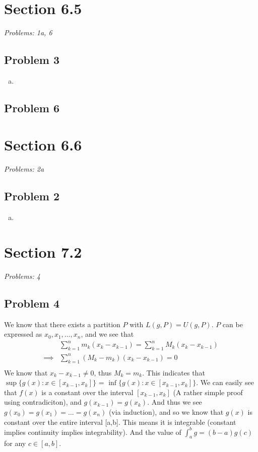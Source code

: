 \documentclass[12pt]{article}
\begin{document}

\section*{Section 6.5}
\textit{Problems: 1a, 6}

\subsection*{Problem 3}
\begin{enumerate}[a).]
    \item {
    }
\end{enumerate}

\subsection*{Problem 6}


\vspace*{1cm}


\section*{Section 6.6}
\textit{Problems: 2a}

\subsection*{Problem 2}
\begin{enumerate}[a).]
    \item {
    }
\end{enumerate}


\vspace*{1cm}


\section*{Section 7.2}
\textit{Problems: 4}

\subsection*{Problem 4}
We know that there exists a partition $P$ with $L(g, P) = U(g,P)$. 
$P$ can be expressed as ${x_0, x_1, \dots, x_n}$, and we see that 
\begin{align*}
&\sum_{k=1}^{n}m_k(x_k - x_{k-1}) = \sum_{k=1}^{n}M_k(x_k - x_{k-1}) \\
\implies &\sum_{k=1}^{n}(M_k - m_k)(x_k - x_{k-1}) = 0\\
\end{align*}
We know that $x_{k} - x_{k-1} \ne 0$, thus $M_k = m_k$.
This indicates that $\sup \{g(x): x \in [x_{k-1}, x_{k}]\}$ = $\inf \{g(x): x \in [x_{k-1}, x_{k}]\}$. 
We can easily see that $f(x)$ is a constant over the interval $[x_{k-1}, x_k]$ (A rather simple proof using contradiciton), and $g(x_{k-1}) = g(x_k)$.
And thus we see $g(x_0) = g(x_1) = \dots = g(x_n)$ (via induction), and so we know that $g(x)$ is constant over the entire interval [a,b]. 
This means it is integrable (constant implies continuity implies integrability). 
And the value of $\int_{a}^{b}g = (b-a)g(c)$ for any $c \in [a,b]$. 
\end{document}
